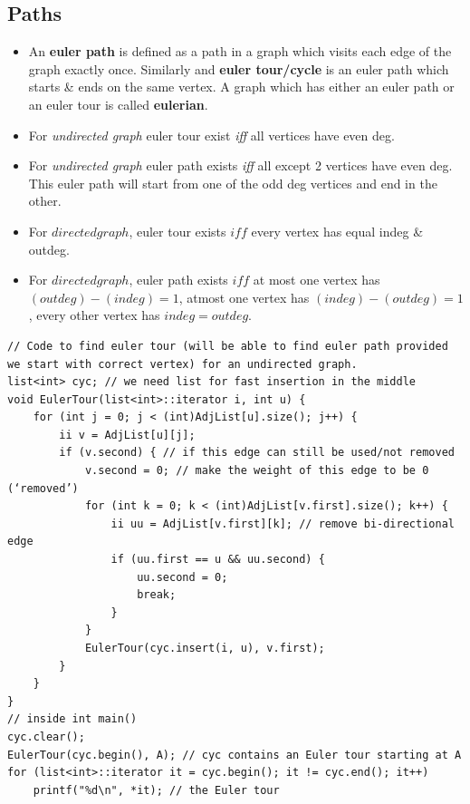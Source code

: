 \documentclass[8pt, a4paper, oneside, twocolumn]{extarticle}
\begin{document}
\subsection{Paths}
\begin{itemize}
    \item An \textbf{euler path} is defined as a path in a graph which visits each edge of the graph exactly once. Similarly and \textbf{euler tour/cycle }is an euler path which starts \& ends on the same vertex. A graph which has either an euler path or an euler tour is called \textbf{eulerian}.
    \item For \textit{undirected graph} euler tour exist \textit{iff} all vertices have even deg.
    \item For \textit{undirected graph} euler path exists \textit{iff} all except 2 vertices have even deg. This euler path will start from one of the odd deg vertices and end in the other.
    \item For $directed graph$, euler tour exists $iff$ every vertex has equal indeg \& outdeg.
    \item For $directed graph$, euler path exists $iff$ at most one vertex has $(outdeg) - (indeg) = 1$, atmost one vertex has $(indeg) - (outdeg) = 1$, every other vertex has $indeg = outdeg$.
\end{itemize}
\begin{verbatim}
// Code to find euler tour (will be able to find euler path provided we start with correct vertex) for an undirected graph.
list<int> cyc; // we need list for fast insertion in the middle
void EulerTour(list<int>::iterator i, int u) {
    for (int j = 0; j < (int)AdjList[u].size(); j++) {
        ii v = AdjList[u][j];
        if (v.second) { // if this edge can still be used/not removed
            v.second = 0; // make the weight of this edge to be 0 (‘removed’)
            for (int k = 0; k < (int)AdjList[v.first].size(); k++) {
                ii uu = AdjList[v.first][k]; // remove bi-directional edge
                if (uu.first == u && uu.second) {
                    uu.second = 0;
                    break;
                } 
            }
            EulerTour(cyc.insert(i, u), v.first);
        } 
    }
}
// inside int main()
cyc.clear();
EulerTour(cyc.begin(), A); // cyc contains an Euler tour starting at A
for (list<int>::iterator it = cyc.begin(); it != cyc.end(); it++)
    printf("%d\n", *it); // the Euler tour
\end{verbatim}
\end{document}
